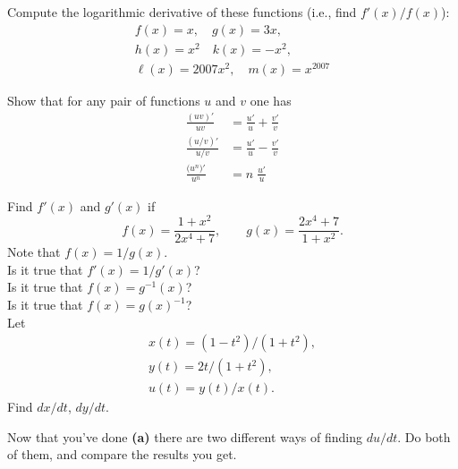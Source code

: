 \begin{multicols}{2}
\subprob Compute the logarithmic derivative of these functions (i.e., find
$f'(x)/f(x)$):
\begin{gather*}
  f(x) = x ,\quad g(x) =3x ,\\
  h(x) =x^2 \quad k(x) =-x^2 ,\\
  \ell(x) =2007x^2,\quad m(x) =x^{2007}
\end{gather*}




\subprob Show that for any pair of functions $u$ and $v$ one has
\begin{align*}
  \frac{(uv)'}{uv} &= \frac{u'}{u} + \frac{v'}{v}\\
  \frac{(u/v)'}{u/v} &= \frac{u'}{u} - \frac{v'}{v}\\
  \frac{\bigl(u^n\bigr)'}{u^n} &= n\; \frac{u'}{u}
\end{align*}
















\problem   
\subprob Find $f'(x)$ and $g'(x)$ if
\[
f(x)=\frac{1+x^2}{2x^4+7}, \qquad g(x)=\frac{2x^4+7}{1+x^2}.
\]
Note that $f(x)=1/g(x)$.\\
\subprob Is it true that $f'(x)=1/g'(x)$?\\
\subprob Is it true that $f(x) = g^{-1}(x)$?\\
\subprob Is it true that $f(x)= g(x)^{-1}$?\\








\problem \subprob Let 
\begin{gather*}
  x(t)=(1-t^2)/(1+t^2),\\
  y(t)=2t/(1+t^2),\\
  u(t)=y(t)/x(t).
\end{gather*}
Find $dx/dt$, $dy/dt$.




\subprob Now that you've done \textbf{(a)} there are two
different ways of finding $du/dt$.  Do
both of them, and compare the results you get.




\end{multicols}
\normalsize\rmfamily








